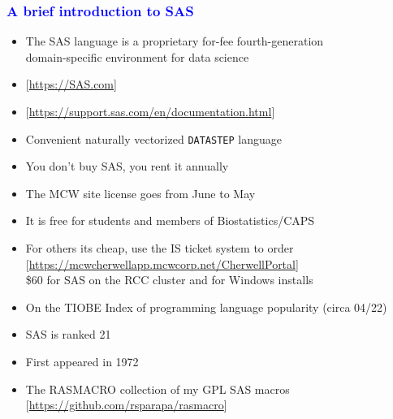 \documentclass[11pt,pdftex,dvipsnames,usenames]{beamer}
\begin{document}
\begin{frame}[fragile]\frametitle{\bf\textcolor{blue}{A brief introduction to SAS}}

\begin{itemize}
\item The SAS language is a proprietary for-fee fourth-generation\\ domain-specific environment for data science
\item \textcolor{PineGreen}{[\href{https://SAS.com}{https://SAS.com}]}
\item \textcolor{PineGreen}{[\href{https://support.sas.com/en/documentation.html}{https://support.sas.com/en/documentation.html}]}
\item Convenient naturally vectorized \texttt{DATASTEP} language 
\item You don't buy SAS, you rent it annually
\item The MCW site license goes from June to May
\item It is free for students and members of Biostatistics/CAPS
\item For others its cheap, use the IS ticket system to order\\
\textcolor{PineGreen}{[\href{https://mcwcherwellapp.mcwcorp.net/CherwellPortal}{https://mcwcherwellapp.mcwcorp.net/CherwellPortal}]} \\
\$60 for SAS on the RCC cluster and for Windows installs  
\item On the TIOBE Index of programming language popularity (circa 04/22)
\item SAS is ranked 21 
\item First appeared in 1972
\item The RASMACRO collection of my GPL SAS macros 
\textcolor{PineGreen}{[\href{https://github.com/rsparapa/rasmacro}{https://github.com/rsparapa/rasmacro}]}
\end{itemize}

\end{frame}
\end{document}
